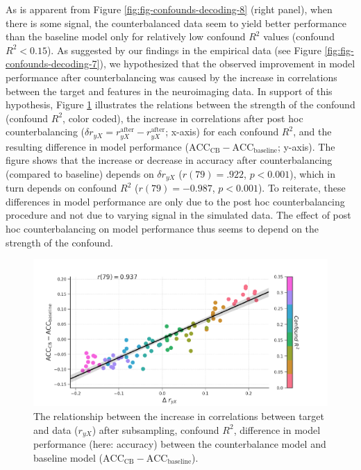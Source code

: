 \documentclass[11pt,american,a4paper,oneside,]{memoir} %
\begin{document}
As is apparent from Figure \ref{fig:fig-confounds-decoding-8} (right panel), when there is some signal, the counterbalanced data seem to yield better performance than the baseline model only for relatively low confound \(R^2\) values (confound \(R^2 < 0.15\)). As suggested by our findings in the empirical data (see Figure \ref{fig:fig-confounds-decoding-7}), we hypothesized that the observed improvement in model performance after counterbalancing was caused by the increase in correlations between the target and features in the neuroimaging data. In support of this hypothesis, Figure \ref{fig:fig-confounds-decoding-9} illustrates the relations between the strength of the confound (confound \(R^2\), color coded), the increase in correlations after post hoc counterbalancing (\(\delta r_{yX} = r_{yX}^{\mathrm{after}} - r_{yX}^{\mathrm{after}}\); x-axis) for each confound \(R^2\), and the resulting difference in model performance (\(\mathrm{ACC}_{\mathrm{CB}} - \mathrm{ACC}_{\mathrm{baseline}}\); y-axis). The figure shows that the increase or decrease in accuracy after counterbalancing (compared to baseline) depends on \(\delta r_{yX}\) (\(r(79) = .922\), \(p < 0.001\)), which in turn depends on confound \(R^2\) (\(r(79) = -0.987\), \(p < 0.001\)). To reiterate, these differences in model performance are only due to the post hoc counterbalancing procedure and not due to varying signal in the simulated data. The effect of post hoc counterbalancing on model performance thus seems to depend on the strength of the confound.

\begin{figure}
\centering
\includegraphics{_bookdown_files/confounds-decoding-files/figures/figure_9.pdf}
\caption{\label{fig:fig-confounds-decoding-9}The relationship between the increase in correlations between target and data (\(r_{yX}\)) after subsampling, confound \(R^2\), difference in model performance (here: accuracy) between the counterbalance model and baseline model (\(\mathrm{ACC}_{\mathrm{CB}} - \mathrm{ACC}_{\mathrm{baseline}}\)).}
\end{figure}
\end{document}
